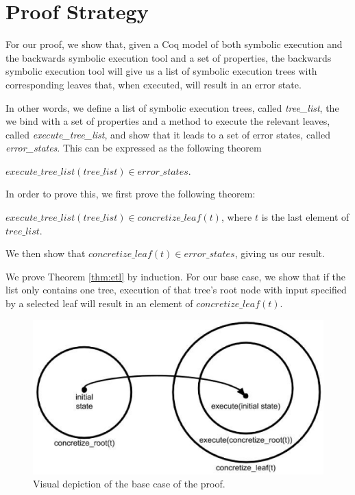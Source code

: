 \section{Proof Strategy}
For our proof, we show that, given a Coq model of both symbolic execution and the backwards symbolic execution tool and a set of properties, 
the backwards symbolic execution tool will give us a list of symbolic execution trees with corresponding leaves that, when executed, will result in an error state.

In other words, we define a list of symbolic execution trees, called \textit{tree\_list}, the we bind with a set of properties and a method to execute the relevant leaves, called \textit{execute\_tree\_list},
and show that it leads to a set of error states, called \textit{error\_states}. This can be expressed as the following theorem


\begin{theorem}
\label{thm:sufficiency}
$execute\_tree\_list (tree\_list) \in error\_states$.
\end{theorem}
 
 In order to prove this, we first prove the following theorem:

\begin{theorem} 
\label{thm:etl}
 $execute\_tree\_list (tree\_list) \in concretize\_leaf (t)$, where $t$ is the last element of $tree\_list$.
\end{theorem}

We then show that $concretize\_leaf (t) \in error\_states$, giving us our result.

We prove Theorem \ref{thm:etl} by induction. 
For our base case, we show that if the list only contains one tree, execution of that tree's root node with input specified by a selected leaf will result in an element of $concretize\_leaf (t)$.

\begin{figure}
\includegraphics[width=\textwidth]{set3.eps}
\caption{Visual depiction of the base case of the proof.}
\label{fig:basecase}
\end{figure}

